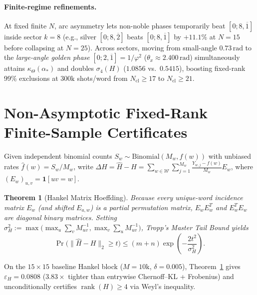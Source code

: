 \documentclass[11pt]{article}
\newtheorem{theorem}{Theorem}
\theoremstyle{definition}
\newcommand{\eps}{\varepsilon}
\begin{document}
\paragraph{Finite-regime refinements.} At fixed finite $N$, arc asymmetry lets non-noble phases temporarily beat $[0;8,\overline{1}]$ inside sector $k=8$ (e.g., silver $[0;8,\overline{2}]$ beats $[0;8,\overline{1}]$ by $+11.1\%$ at $N=15$ before collapsing at $N=25$). Across sectors, moving from small-angle $0.73\,\text{rad}$ to the \emph{large-angle golden phase} $[0;2,\overline{1}]=1/\varphi^2$ ($\theta_x\approx 2.400\,\text{rad}$) simultaneously attains $\kappa_\Theta(\alpha_*)$ and doubles $\sigma_4(H)$ ($1.0856$ vs.\ $0.5415$), boosting fixed-rank 99\% exclusions at $300\text{k}$ shots/word from $N_{\mathrm{cl}}\ge 17$ to $N_{\mathrm{cl}}\ge 21$.

\section{Non-Asymptotic Fixed-Rank Finite-Sample Certificates}

Given independent binomial counts $S_w\sim\mathrm{Binomial}(M_w,f(w))$ with unbiased rates $\hat{f}(w)=S_w/M_w$, write $\Delta H=\hat{H}-H=\sum_{w\in\mathcal{W}}\sum_{j=1}^{M_w}\frac{Y_{w,j}-f(w)}{M_w}E_w$, where $(E_w)_{u,v}=\mathbf{1}[uv=w]$.

\begin{theorem}[Hankel Matrix Hoeffding]\label{thm:mh}
Because every unique-word incidence matrix $E_w$ (and shifted $E_{a,w}$) is a partial permutation matrix, $E_wE_w^T$ and $E_w^TE_w$ are diagonal binary matrices. Setting $\sigma_H^2:=\max\bigl(\max_u\sum_v M_{uv}^{-1},\max_v\sum_u M_{uv}^{-1}\bigr)$, Tropp's Master Tail Bound \cite[Thm.~3.6]{Tropp2012} yields
\[
 \Pr\!\bigl(\|\hat{H}-H\|_2\ge t\bigr) \le (m+n)\exp\!\left(-\frac{2t^2}{\sigma_H^2}\right).
\]
\end{theorem}

On the $15\times 15$ baseline Hankel block ($M=10\text{k}$, $\delta=0.005$), Theorem~\ref{thm:mh} gives $\eps_H=0.0808$ ($3.83\times$ tighter than entrywise Chernoff--KL + Frobenius) and unconditionally certifies $\operatorname{rank}(H)\ge 4$ via Weyl's inequality.
\end{document}
